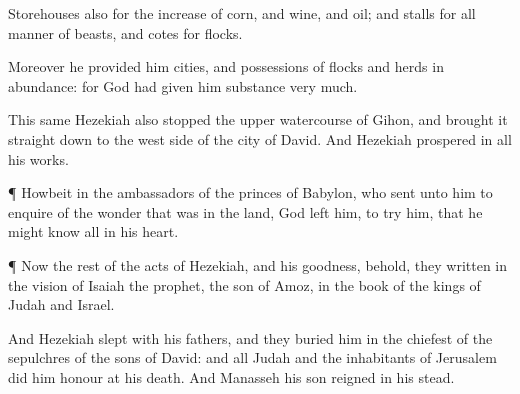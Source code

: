 {Storehouses also for the
increase of
corn, and
wine, and
oil; and
stalls for all manner of
beasts, and
cotes for
flocks.

Moreover he
provided him
cities, and
possessions of
flocks and
herds in
abundance: for
God had
given him
substance
very
much.

This same
Hezekiah also
stopped the
upper
watercourse of
Gihon, and brought it
straight
down to the west
side of the
city of
David. And
Hezekiah
prospered in all his
works.


\par }{\PP {}¶
Howbeit in
{} the
ambassadors of the
princes of
Babylon, who
sent unto him to
enquire of the
wonder that was
{} in the
land,
God
left him, to
try him, that he might
know all
{} in his
heart.


\par }{\PP {}¶ Now the
rest of the
acts of
Hezekiah, and his
goodness, behold, they
{}
written in the
vision of
Isaiah the
prophet, the
son of
Amoz,
{} in the
book of the
kings of
Judah and
Israel.

And
Hezekiah
slept with his
fathers, and they
buried him in the
chiefest of the
sepulchres of the
sons of
David: and all
Judah and the
inhabitants of
Jerusalem did
him
honour at his
death. And
Manasseh his
son
reigned in his stead.




\par }
